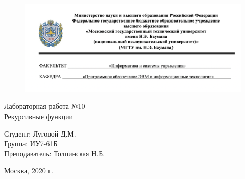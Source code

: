 \begin{figure}[h!]
	\begin{center}
		{\includegraphics[width = \textwidth]{titul.png}}
	\end{center}
\end{figure}

\vspace*{20mm}

\huge
\begin{center}
	Лабораторная работа №10\\
	Рекурсивные функции
\end{center}


\vspace*{45mm}

\large
\begin{flushleft}
	Студент: Луговой Д.М. \\
	Группа: ИУ7-61Б \\
	Преподаватель: Толпинская Н.Б.
\end{flushleft}

\vspace*{55mm}

\large
\begin{center}
	Москва, 2020 г.
\end{center}

\thispagestyle{empty}
